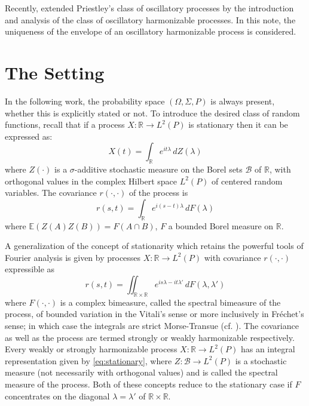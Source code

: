 \documentclass[12pt]{article}
\begin{document}
Recently, \cite{Swift1997a,Swift1997b,SwiftToAppear} extended Priestley's class of oscillatory processes by the introduction and analysis of the class of oscillatory harmonizable processes. In this note, the uniqueness of the envelope of an oscillatory harmonizable process is considered.

\section{The Setting}

In the following work, the probability space $(\Omega, \Sigma, P)$ is always present, whether this is explicitly stated or not. To introduce the desired class of random functions, recall that if a process $X:\mathbb{R} \to L^2(P)$ is stationary then it can be expressed as:
\begin{equation}
    X(t) = \int_{\mathbb{R}} e^{it\lambda} \, dZ(\lambda)
    \label{eq:stationary}
\end{equation}
where $Z(\cdot)$ is a $\sigma$-additive stochastic measure on the Borel sets $\mathcal{B}$ of $\mathbb{R}$, with orthogonal values in the complex Hilbert space $L^2(P)$ of centered random variables. The covariance $r(\cdot, \cdot)$ of the process is
\begin{equation}
    r(s, t) = \int_{\mathbb{R}} e^{i(s-t)\lambda} \, dF(\lambda)
    \label{eq:stationary_cov}
\end{equation}
where $\mathbb{E}(Z(A)Z(B)) = F(A \cap B)$, $F$ a bounded Borel measure on $\mathbb{R}$.

A generalization of the concept of stationarity which retains the powerful tools of Fourier analysis is given by processes $X:\mathbb{R} \to L^2(P)$ with covariance $r(\cdot, \cdot)$ expressible as
\begin{equation}
    r(s, t) = \iint_{\mathbb{R} \times \mathbb{R}} e^{is\lambda - it\lambda'} \, dF(\lambda, \lambda')
    \label{eq:harmonizable_cov}
\end{equation}
where $F(\cdot, \cdot)$ is a complex bimeasure, called the spectral bimeasure of the process, of bounded variation in the Vitali's sense or more inclusively in Fréchet's sense; in which case the integrals are strict Morse-Transue (cf. \cite{Rao1984}). The covariance as well as the process are termed strongly or weakly harmonizable respectively. Every weakly or strongly harmonizable process $X:\mathbb{R} \to L^2(P)$ has an integral representation given by \eqref{eq:stationary}, where $Z:\mathcal{B} \to L^2(P)$ is a stochastic measure (not necessarily with orthogonal values) and is called the spectral measure of the process. Both of these concepts reduce to the stationary case if $F$ concentrates on the diagonal $\lambda = \lambda'$ of $\mathbb{R} \times \mathbb{R}$.
\end{document}

